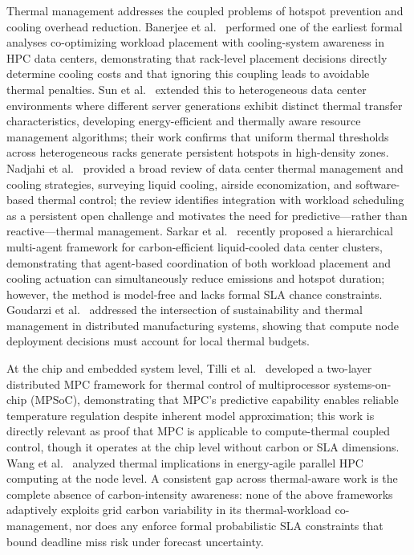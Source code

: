 \documentclass[a4paper,fleqn]{cas-dc}
\begin{document}
Thermal management addresses the coupled problems of hotspot prevention and cooling overhead reduction. Banerjee et al.~\cite{ref-banerjee11} performed one of the earliest formal analyses co-optimizing workload placement with cooling-system awareness in HPC data centers, demonstrating that rack-level placement decisions directly determine cooling costs and that ignoring this coupling leads to avoidable thermal penalties. Sun et al.~\cite{ref-sun14} extended this to heterogeneous data center environments where different server generations exhibit distinct thermal transfer characteristics, developing energy-efficient and thermally aware resource management algorithms; their work confirms that uniform thermal thresholds across heterogeneous racks generate persistent hotspots in high-density zones. Nadjahi et al.~\cite{ref-nadjahi18} provided a broad review of data center thermal management and cooling strategies, surveying liquid cooling, airside economization, and software-based thermal control; the review identifies integration with workload scheduling as a persistent open challenge and motivates the need for predictive---rather than reactive---thermal management. Sarkar et al.~\cite{ref-sarkar25} recently proposed a hierarchical multi-agent framework for carbon-efficient liquid-cooled data center clusters, demonstrating that agent-based coordination of both workload placement and cooling actuation can simultaneously reduce emissions and hotspot duration; however, the method is model-free and lacks formal SLA chance constraints. Goudarzi et al.~\cite{ref-goudarzi24} addressed the intersection of sustainability and thermal management in distributed manufacturing systems, showing that compute node deployment decisions must account for local thermal budgets.

At the chip and embedded system level, Tilli et al.~\cite{ref-tilli22} developed a two-layer distributed MPC framework for thermal control of multiprocessor systems-on-chip (MPSoC), demonstrating that MPC's predictive capability enables reliable temperature regulation despite inherent model approximation; this work is directly relevant as proof that MPC is applicable to compute-thermal coupled control, though it operates at the chip level without carbon or SLA dimensions. Wang et al.~\cite{ref-wang18} analyzed thermal implications in energy-agile parallel HPC computing at the node level. A consistent gap across thermal-aware work is the complete absence of carbon-intensity awareness: none of the above frameworks adaptively exploits grid carbon variability in its thermal-workload co-management, nor does any enforce formal probabilistic SLA constraints that bound deadline miss risk under forecast uncertainty.
\end{document}
